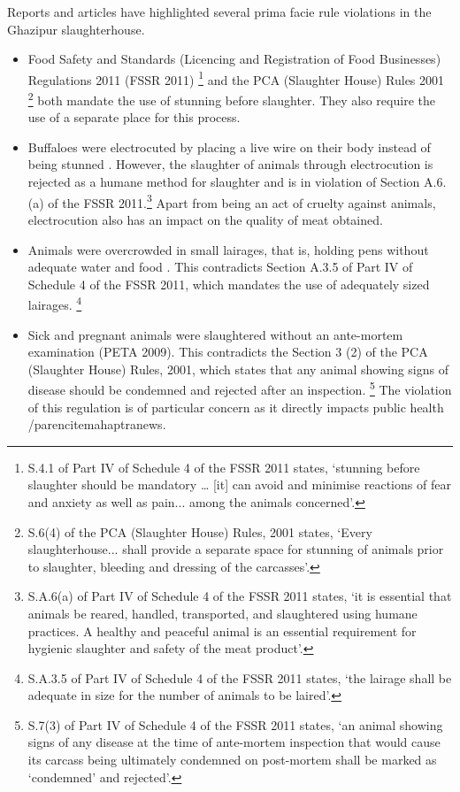 \documentclass[a4paper, 12pt]{article}
\begin{document}
Reports and articles have highlighted several prima facie rule violations in the Ghazipur slaughterhouse. \\

\begin{itemize}
\item Food Safety and Standards (Licencing and Registration of Food Businesses) Regulations 2011 (FSSR 2011) \footnote{S.4.1 of Part IV of Schedule 4 of the FSSR 2011 states, ‘stunning before slaughter should be mandatory … [it] can avoid and minimise reactions of fear and anxiety as well as pain... among the animals concerned’.} and the PCA (Slaughter House) Rules 2001 \footnote{ S.6(4) of the PCA (Slaughter House) Rules, 2001 states, ‘Every slaughterhouse... shall provide a separate space for stunning of animals prior to slaughter, bleeding and dressing of the carcasses’.} both mandate the use of stunning before slaughter. They also require the use of a separate place for this process.
\item Buffaloes were electrocuted by placing a live wire on their body instead of being stunned \parencite{indiannews} \parencite{petareport}. However, the slaughter of animals through electrocution is rejected as a humane method for slaughter \parencite{chaudrypaper} and is in violation of Section A.6.(a) of the FSSR 2011.\footnote{ S.A.6(a) of Part IV of Schedule 4 of the FSSR 2011 states, ‘it is essential that animals be reared, handled, transported, and slaughtered using humane practices. A healthy and peaceful animal is an essential requirement for hygienic slaughter and safety of the meat product’.} Apart from being an act of cruelty against animals, electrocution also has an impact on the quality of meat obtained.
\item Animals were overcrowded in small lairages, that is, holding pens without adequate water and food \parencite{maanvinews}. This contradicts Section A.3.5 of Part IV of Schedule 4 of the FSSR 2011, which mandates the use of adequately sized lairages. \footnote{ S.A.3.5 of Part IV of Schedule 4 of the FSSR 2011 states, ‘the lairage shall be adequate in size for the number of animals to be laired’.}
\item Sick and pregnant animals were slaughtered without an ante-mortem examination (PETA 2009). This contradicts the Section 3 (2) of the PCA (Slaughter House) Rules, 2001, which states that any animal showing signs of disease should be condemned and rejected after an inspection. \footnote{ S.7(3) of Part IV of Schedule 4 of the FSSR 2011 states, ‘an animal showing signs of any disease at the time of ante-mortem inspection that would cause its carcass being ultimately condemned on post-mortem shall be marked as ‘condemned’ and rejected’.} The violation of this regulation is of particular concern as it directly impacts public health /parencite{mahaptranews}.

\end{itemize}
\end{document}
